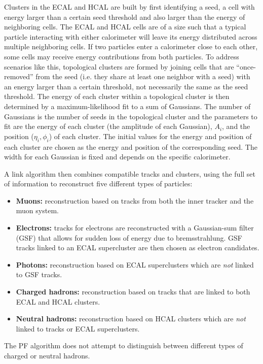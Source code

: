 Clusters in the ECAL and HCAL are built by first identifying a seed, a cell with energy larger than a certain seed threshold and also larger than the energy of neighboring cells.
The ECAL and HCAL cells are of a size such that a typical particle interacting with either calorimeter will leave its energy distributed across multiple neighboring cells.
If two particles enter a calorimeter close to each other, some cells may receive energy contributions from both particles.
To address scenarios like this, topological clusters are formed by joining cells that are ``once-removed'' from the seed (i.e. they share at least one neighbor with a seed) with an energy larger than a certain threshold, not necessarily the same as the seed threshold.
The energy of each cluster within a topological cluster is then determined by a maximum-likelihood fit to a sum of Gaussians.
The number of Gaussians is the number of seeds in the topological cluster and the parameters to fit are the energy of each cluster (the amplitude of each Gaussian), $A_i$, and the position ($\eta_i, \phi_i$) of each cluster.
The initial values for the energy and position of each cluster are chosen as the energy and position of the corresponding seed.
The width for each Gaussian is fixed and depends on the specific calorimeter.

A link algorithm then combines compatible tracks and clusters, using the full set of information to reconstruct five different types of particles:
\begin{itemize}
    \item \textbf{Muons:} reconstruction based on tracks from both the inner tracker and the muon system.
    \item \textbf{Electrons:} tracks for electrons are reconstructed with a Gaussian-sum filter (GSF) that allows for sudden loss of energy due to bremsstrahlung. GSF tracks linked to an ECAL supercluster are then chosen as electron candidates.
    \item \textbf{Photons:} reconstruction based on ECAL superclusters which are \emph{not} linked to GSF tracks.
    \item \textbf{Charged hadrons:} reconstruction based on tracks that are linked to both ECAL and HCAL clusters.
    \item \textbf{Neutral hadrons:} reconstruction based on HCAL clusters which are \emph{not} linked to tracks or ECAL superclusters.
\end{itemize}

The PF algorithm does not attempt to distinguish between different types of charged or neutral hadrons.
